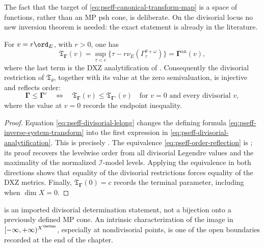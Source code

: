 The fact that the target of \eqref{eq:pseff-canonical-transform-map} is a
space of functions, rather than an MP psh cone, is deliberate.  On the
divisorial locus no new inversion theorem is needed: the exact statement is
already in the literature.

\begin{theorem}\label{thm:pseff-divisorial-inversion}
For \(v=r\ord_E\), with \(r>0\), one has
\[
 \mathfrak T_{\boldsymbol\Gamma}(v)
 =\sup_{\tau<c}\{\tau-r\nu_E(
       \Gamma^{\theta+\omega}_\tau)\}
 =\boldsymbol\Gamma^{\mathrm{an}}(v),
\tag{71.31}\label{eq:pseff-divisorial-analytification}
\]
where the last term is the DXZ analytification of
\cite[Definition~3.11]{Xia23Operations}.  Consequently the divisorial
restriction of \(\mathfrak T_\theta\), together with its value at the
zero semivaluation, is injective and reflects order:
\[
 \boldsymbol\Gamma\leq\boldsymbol\Gamma'
 \quad\Longleftrightarrow\quad
 \mathfrak T_{\boldsymbol\Gamma}(v)
 \leq\mathfrak T_{\boldsymbol\Gamma'}(v)
 \quad\text{for }v=0\text{ and every divisorial }v,
\tag{71.32}\label{eq:pseff-order-reflection}
\]
where the value at \(v=0\) records the endpoint inequality.
\end{theorem}

\begin{proof}
Equation \eqref{eq:pseff-divisorial-lelong} changes the defining formula
\eqref{eq:pseff-inverse-system-transform} into the first expression in
\eqref{eq:pseff-divisorial-analytification}.  This is precisely
\cite[formula~(3.7)]{Xia23Operations}.  The equivalence
\eqref{eq:pseff-order-reflection} is
\cite[Lemma~4.2]{Xia23Operations}; its proof recovers the levelwise order
from all divisorial Legendre values and the maximality of the normalized
\(\mathcal I\)-model levels.  Applying the equivalence in both directions
shows that equality of the divisorial restrictions forces equality of the
DXZ metrics.  Finally,
\(\mathfrak T_{\boldsymbol\Gamma}(0)=c\) records the terminal parameter,
including when \(\dim X=0\).
\end{proof}

\begin{remark}\label{rem:pseff-injection-not-bijection}
 is an imported divisorial
determination statement, not a
bijection onto a previously defined MP cone.  An intrinsic
characterization of the image in
\([ -\infty,+\infty)^{X^{\bethan}}\), especially at nondivisorial points,
is one of the open boundaries recorded at the end of the chapter.
\end{remark}

